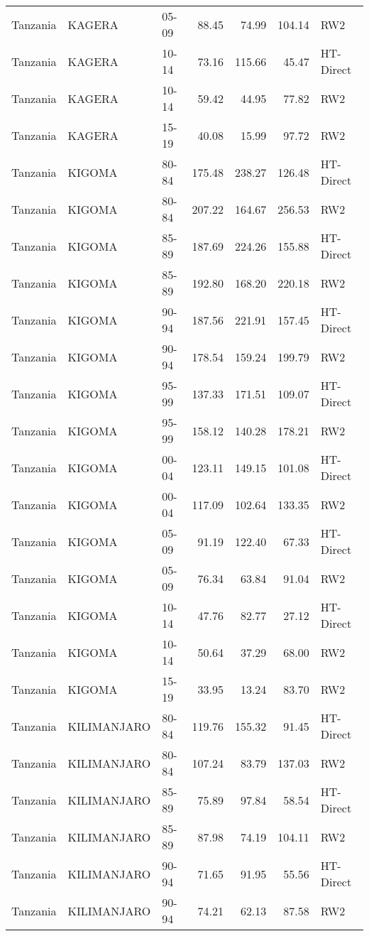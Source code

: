 \begin{longtable}{lllrrrl}
  Tanzania & KAGERA & 05-09 & 88.45 & 74.99 & 104.14 & RW2 \\ 
  Tanzania & KAGERA & 10-14 & 73.16 & 115.66 & 45.47 & HT-Direct \\ 
  Tanzania & KAGERA & 10-14 & 59.42 & 44.95 & 77.82 & RW2 \\ 
  Tanzania & KAGERA & 15-19 & 40.08 & 15.99 & 97.72 & RW2 \\ 
  Tanzania & KIGOMA & 80-84 & 175.48 & 238.27 & 126.48 & HT-Direct \\ 
  Tanzania & KIGOMA & 80-84 & 207.22 & 164.67 & 256.53 & RW2 \\ 
  Tanzania & KIGOMA & 85-89 & 187.69 & 224.26 & 155.88 & HT-Direct \\ 
  Tanzania & KIGOMA & 85-89 & 192.80 & 168.20 & 220.18 & RW2 \\ 
  Tanzania & KIGOMA & 90-94 & 187.56 & 221.91 & 157.45 & HT-Direct \\ 
  Tanzania & KIGOMA & 90-94 & 178.54 & 159.24 & 199.79 & RW2 \\ 
  Tanzania & KIGOMA & 95-99 & 137.33 & 171.51 & 109.07 & HT-Direct \\ 
  Tanzania & KIGOMA & 95-99 & 158.12 & 140.28 & 178.21 & RW2 \\ 
  Tanzania & KIGOMA & 00-04 & 123.11 & 149.15 & 101.08 & HT-Direct \\ 
  Tanzania & KIGOMA & 00-04 & 117.09 & 102.64 & 133.35 & RW2 \\ 
  Tanzania & KIGOMA & 05-09 & 91.19 & 122.40 & 67.33 & HT-Direct \\ 
  Tanzania & KIGOMA & 05-09 & 76.34 & 63.84 & 91.04 & RW2 \\ 
  Tanzania & KIGOMA & 10-14 & 47.76 & 82.77 & 27.12 & HT-Direct \\ 
  Tanzania & KIGOMA & 10-14 & 50.64 & 37.29 & 68.00 & RW2 \\ 
  Tanzania & KIGOMA & 15-19 & 33.95 & 13.24 & 83.70 & RW2 \\ 
  Tanzania & KILIMANJARO & 80-84 & 119.76 & 155.32 & 91.45 & HT-Direct \\ 
  Tanzania & KILIMANJARO & 80-84 & 107.24 & 83.79 & 137.03 & RW2 \\ 
  Tanzania & KILIMANJARO & 85-89 & 75.89 & 97.84 & 58.54 & HT-Direct \\ 
  Tanzania & KILIMANJARO & 85-89 & 87.98 & 74.19 & 104.11 & RW2 \\ 
  Tanzania & KILIMANJARO & 90-94 & 71.65 & 91.95 & 55.56 & HT-Direct \\ 
  Tanzania & KILIMANJARO & 90-94 & 74.21 & 62.13 & 87.58 & RW2 \\ 

\end{longtable}

